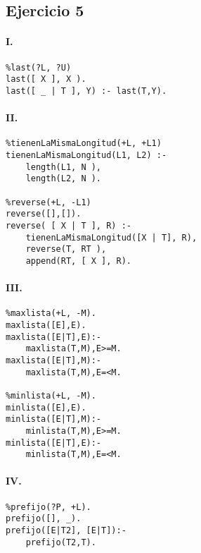 \documentclass[10pt,a4paper]{article}
\begin{document}
\subsection{Ejercicio 5}
\begin{multicols}{2}
\paragraph{I.}
\begin{centrado2}
\begin{verbatim}
%last(?L, ?U)
last([ X ], X ).
last([ _ | T ], Y) :- last(T,Y).
\end{verbatim}
\end{centrado2}
\paragraph{II.}
\begin{centrado2}
\begin{verbatim}
%tienenLaMismaLongitud(+L, +L1)
tienenLaMismaLongitud(L1, L2) :-
	length(L1, N ),
	length(L2, N ).

%reverse(+L, -L1)
reverse([],[]).
reverse( [ X | T ], R) :-
	tienenLaMismaLongitud([X | T], R),
	reverse(T, RT ),
	append(RT, [ X ], R).
\end{verbatim}
\end{centrado2}
\paragraph{III.}
\begin{centrado2}
\begin{verbatim}
%maxlista(+L, -M).
maxlista([E],E).
maxlista([E|T],E):-
    maxlista(T,M),E>=M.
maxlista([E|T],M):-
    maxlista(T,M),E=<M.

%minlista(+L, -M).
minlista([E],E).
minlista([E|T],M):-
    minlista(T,M),E>=M.
minlista([E|T],E):-
    minlista(T,M),E=<M.
\end{verbatim}
\end{centrado2}

\paragraph{IV.}
\begin{centrado2}
\begin{verbatim}
%prefijo(?P, +L).
prefijo([], _).
prefijo([E|T2], [E|T]):-
    prefijo(T2,T).
\end{verbatim}
\end{centrado2}


\end{multicols}
\end{document}
